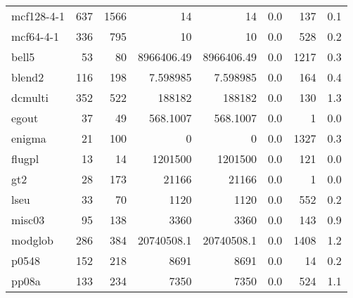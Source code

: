 \documentclass[leqno]{article}
\begin{document}
\begin{center}
\setlength{\tabcolsep}{2pt}
\newcommand{\g}{\raisebox{0.25ex}{\tiny $>$}}
\tablelasttail{\bottomrule}
\begin{supertabular*}{\textwidth}{@{\extracolsep{\fill}}lrrrrrrr@{}}
mcf128-4-1          &    637 &   1566 &               14 &               14 &    0.0 &       137 &      0.1\\
mcf64-4-1           &    336 &    795 &               10 &               10 &    0.0 &       528 &      0.2\\
bell5               &     53 &     80 &       8966406.49 &       8966406.49 &    0.0 &      1217 &      0.3\\
blend2              &    116 &    198 &         7.598985 &         7.598985 &    0.0 &       164 &      0.4\\
dcmulti             &    352 &    522 &           188182 &           188182 &    0.0 &       130 &      1.3\\
egout               &     37 &     49 &         568.1007 &         568.1007 &    0.0 &         1 &      0.0\\
enigma              &     21 &    100 &                0 &                0 &    0.0 &      1327 &      0.3\\
flugpl              &     13 &     14 &          1201500 &          1201500 &    0.0 &       121 &      0.0\\
gt2                 &     28 &    173 &            21166 &            21166 &    0.0 &         1 &      0.0\\
lseu                &     33 &     70 &             1120 &             1120 &    0.0 &       552 &      0.2\\
misc03              &     95 &    138 &             3360 &             3360 &    0.0 &       143 &      0.9\\
modglob             &    286 &    384 &       20740508.1 &       20740508.1 &    0.0 &      1408 &      1.2\\
p0548               &    152 &    218 &             8691 &             8691 &    0.0 &        14 &      0.2\\
pp08a               &    133 &    234 &             7350 &             7350 &    0.0 &       524 &      1.1\\

\end{supertabular*}
\end{center}
\end{document}
